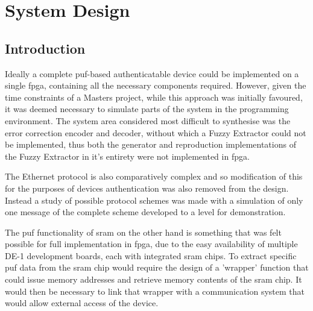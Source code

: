 
\chapter{System Design} %

\label{ch:design}  



\section{Introduction}

Ideally a complete \gls{puf}-based authenticatable device could be implemented
on a single \gls{fpga}, containing all the necessary components required.
However, given the time constraints of a Masters project, while this approach
was initially favoured, it was deemed necessary to simulate parts of the system
in the \matlab programming environment. The system area considered most
difficult to synthesise was the error correction encoder and decoder, without
which a Fuzzy Extractor could not be implemented, thus both the generator and
reproduction implementations of the Fuzzy Extractor in it's
entirety were not implemented in \gls{fpga}.

The Ethernet protocol is also comparatively complex and so modification of this
for the purposes of devices authentication was also removed from the design.
Instead a study of possible protocol schemes was made with
a simulation of only one message of the complete scheme developed to a level
for demonstration.

The \gls{puf} functionality of \gls{sram} on the other hand is something
that was felt possible for full implementation in \gls{fpga}, due to the easy availability of multiple DE-1 development boards, each with integrated
\gls{sram} chips.
To extract specific \gls{puf} data from the \gls{sram} chip would require the design of
a 'wrapper' function that could issue memory addresses and retrieve memory
contents of the \gls{sram} chip. It would then be necessary to link that wrapper
with a communication system that would allow external access of the device.

